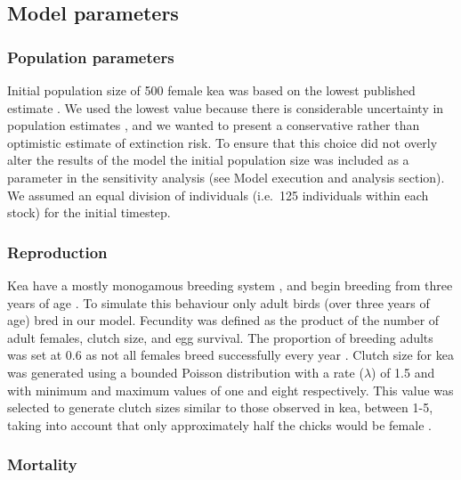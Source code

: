 \documentclass[11pt,]{article}
\begin{document}
\hypertarget{model-parameters}{%
\subsection{Model parameters}\label{model-parameters}}

\hypertarget{population-parameters}{%
\subsubsection{Population parameters}\label{population-parameters}}

Initial population size of 500 female kea was based on the lowest
published estimate \citep{pullar1996}. We used the lowest value because
there is considerable uncertainty in population estimates
\citep{orrWalker2009}, and we wanted to present a conservative rather
than optimistic estimate of extinction risk. To ensure that this choice
did not overly alter the results of the model the initial population
size was included as a parameter in the sensitivity analysis (see Model
execution and analysis section). We assumed an equal division of
individuals (i.e.~125 individuals within each stock) for the initial
timestep.

\hypertarget{reproduction}{%
\subsubsection{Reproduction}\label{reproduction}}

Kea have a mostly monogamous breeding system \citep{bond1991}, and begin
breeding from three years of age \citep{jackson1963}. To simulate this
behaviour only adult birds (over three years of age) bred in our model.
Fecundity was defined as the product of the number of adult females,
clutch size, and egg survival. The proportion of breeding adults was set
at 0.6 as not all females breed successfully every year
\citep{bond1991}. Clutch size for kea was generated using a bounded
Poisson distribution with a rate (\(\lambda\)) of 1.5 and with minimum
and maximum values of one and eight respectively. This value was
selected to generate clutch sizes similar to those observed in kea,
between 1-5, taking into account that only approximately half the chicks
would be female \citep{bond1992}.

\hypertarget{mortality}{%
\subsubsection{Mortality}\label{mortality}}
\end{document}
